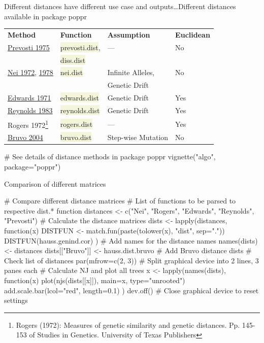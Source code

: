 \documentclass[compress, xelatex, 11pt, xcolor=svgnames, aspectratio=169, url={hyphens, lowtilde}]{beamer}
\renewcommand{\texttt}[1]{\colorbox{Beige}{{\ttfamily #1}}}
\begin{document}
\begin{frame}[fragile]{Different distances have different use case and outputs\ldots}{Different distances available in package poppr}
	\vfill
	\begin{tabular}{llll}
		\textbf{Method} & \textbf{Function} & \textbf{Assumption} & \textbf{Euclidean}\\
		\href{https://link.springer.com/article/10.1007/BF00831894}{Prevosti 1975} & \texttt{prevosti.dist}, & --- & \alert{No}\\
			& \texttt{diss.dist} & & \\
		\href{https://www.jstor.org/stable/2459777}{Nei 1972}, \href{https://doi.org/10.1093/genetics/89.3.583}{1978} & \texttt{nei.dist} & Infinite Alleles, & \alert{No}\\
			& & Genetic Drift & \\
		\href{https://doi.org/10.2307/2528824}{Edwards 1971} & \texttt{edwards.dist} & Genetic Drift & Yes\\
		\href{https://doi.org/10.1093/genetics/106.3.575}{Reynolds 1983} & \texttt{reynolds.dist} & Genetic Drift & Yes\\
		Rogers 1972\footnote{Rogers (1972): Measures of genetic similarity and genetic distances. Pp. 145-153 of Studies in Genetics. University of Texas Publishers} & \texttt{rogers.dist} & --- & Yes\\
		\href{https://doi.org/10.1111/j.1365-294X.2004.02209.x}{Bruvo 2004} & \texttt{bruvo.dist} & Step-wise Mutation & \alert{No}
	\end{tabular}
	\vfill
	\begin{spluscode}
    # See details of distance methods in package poppr
    vignette("algo", package="poppr")
	\end{spluscode}
	\vfill
\end{frame}

\begin{frame}[fragile]{Comparison of different matrices}
	\begin{spluscode}
    # Compare different distance matrices
    # List of functions to be parsed to respective dist.* function
    distances <- c("Nei", "Rogers", "Edwards", "Reynolds", "Prevosti")
    # Calculate the distance matrices
    dists <- lapply(distances, function(x) {
      DISTFUN <- match.fun(paste(tolower(x), "dist", sep="."))
      DISTFUN(hauss.genind.cor) })
    # Add names for the distance names
    names(dists) <- distances
    dists[["Bruvo"]] <- hauss.dist.bruvo # Add Bruvo distance
    dists # Check list of distances
    par(mfrow=c(2, 3)) # Split graphical device into 2 lines, 3 panes each
    # Calculate NJ and plot all trees
    x <- lapply(names(dists), function(x) { plot(njs(dists[[x]]), main=x,
      type="unrooted")
      add.scale.bar(lcol="red", length=0.1) })
    dev.off() # Close graphical device to reset settings
	\end{spluscode}
\end{frame}
\end{document}
